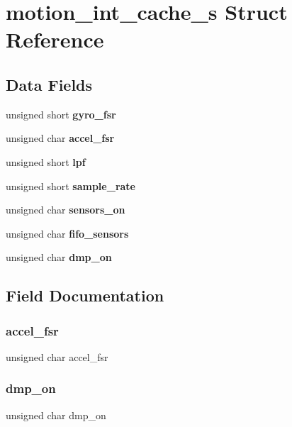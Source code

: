 \section{motion\+\_\+int\+\_\+cache\+\_\+s Struct Reference}
\label{structmotion__int__cache__s}
\subsection*{Data Fields}
\begin{DoxyCompactItemize}
\item 
unsigned short \textbf{ gyro\+\_\+fsr}
\item 
unsigned char \textbf{ accel\+\_\+fsr}
\item 
unsigned short \textbf{ lpf}
\item 
unsigned short \textbf{ sample\+\_\+rate}
\item 
unsigned char \textbf{ sensors\+\_\+on}
\item 
unsigned char \textbf{ fifo\+\_\+sensors}
\item 
unsigned char \textbf{ dmp\+\_\+on}
\end{DoxyCompactItemize}


\subsection{Field Documentation}
\mbox{\label{structmotion__int__cache__s_a97d5de8aa2fab5cc81ca2180130fc6ac}} 
\subsubsection{accel\+\_\+fsr}
{\footnotesize\ttfamily unsigned char accel\+\_\+fsr}

\mbox{\label{structmotion__int__cache__s_a49fb51079238683b21264827348b5968}} 
\subsubsection{dmp\+\_\+on}
{\footnotesize\ttfamily unsigned char dmp\+\_\+on}

